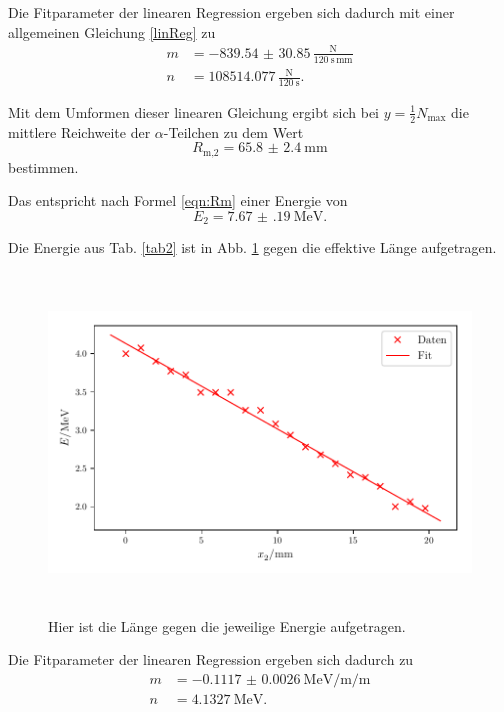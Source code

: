 \noindent Die Fitparameter der linearen Regression ergeben sich dadurch mit einer allgemeinen Gleichung \eqref{linReg} zu 
\begin{align*}
    m &= -\num{839.54(3085)}\, \frac{\text{N}}{\SI{120}{\second} \, \si{\milli\meter}} \\
    n &= \num{108514.077} \, \frac{\text{N}}{\SI{120}{\second}} .
\end{align*}


\noindent Mit dem Umformen dieser linearen Gleichung ergibt sich bei $y = \frac{1}{2} N_\text{max}$ die mittlere Reichweite der $\alpha$-Teilchen zu dem Wert %
\begin{equation*}
    R_\text{m,2} = \SI{65.8(24)}{\milli\meter}
\end{equation*}
bestimmen.

\noindent Das entspricht nach Formel \eqref{eqn:Rm} einer Energie von %
\begin{equation*}
    E_2 = \SI{7.67(19)}{\mega\electronvolt}.
\end{equation*}

\noindent Die Energie aus Tab. \ref{tab2} ist in Abb. \ref{fig:energie2} gegen die effektive Länge aufgetragen.
\begin{figure}
    \centering
    \includegraphics[width=15cm, height=9cm]{build/plotd.pdf}
    \caption{Hier ist die Länge gegen die jeweilige Energie aufgetragen.}
    \label{fig:energie2}
\end{figure}

\noindent Die Fitparameter der linearen Regression ergeben sich dadurch zu 
\begin{align*}
    m &= -\SI{0.1117(26)}{\mega\electronvolt\per\milli\per\meter} \\
    n &= \SI{4.1327}{\mega\electronvolt} .
\end{align*}

